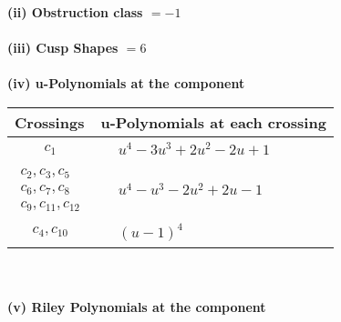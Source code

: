 \documentclass[1p]{elsarticle_modified}
\theoremstyle{definition}
\begin{document}
\flushleft \textbf{(ii) Obstruction class $= -1$}\\~\\
\flushleft \textbf{(iii) Cusp Shapes $= 6$}\\~\\
\newpage\renewcommand{\arraystretch}{1}
\flushleft \textbf{(iv) u-Polynomials at the component}\newline \\
\begin{tabular}{m{50pt}|m{274pt}}
Crossings & \hspace{64pt}u-Polynomials at each crossing \\
\hline $$\begin{aligned}c_{1}\end{aligned}$$&$\begin{aligned}
&u^4-3 u^3+2 u^2-2 u+1
\end{aligned}$\\
\hline $$\begin{aligned}c_{2},c_{3},c_{5}\\c_{6},c_{7},c_{8}\\c_{9},c_{11},c_{12}\end{aligned}$$&$\begin{aligned}
&u^4- u^3-2 u^2+2 u-1
\end{aligned}$\\
\hline $$\begin{aligned}c_{4},c_{10}\end{aligned}$$&$\begin{aligned}
&(u-1)^4
\end{aligned}$\\
\hline
\end{tabular}\\~\\
\newpage\renewcommand{\arraystretch}{1}
\flushleft \textbf{(v) Riley Polynomials at the component}\newline \\
\end{document}
